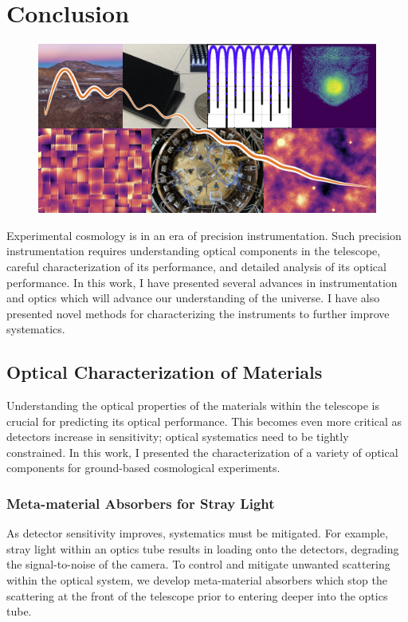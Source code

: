 \chapter{Conclusion}
\label{ch:conclusion}
\begin{figure}[H]
    \centering
    \includegraphics[width = \textwidth]{Figures/conclusion.png}
    \label{fig:finalfigure}
\end{figure}
Experimental cosmology is in an era of precision instrumentation.  Such precision instrumentation requires understanding optical components in the telescope, careful characterization of its performance, and detailed analysis of its optical performance.  In this work, I have presented several advances in instrumentation and optics which will advance our understanding of the universe.  I have also presented novel methods for characterizing the instruments to further improve systematics. 

\section{Optical Characterization of Materials}
Understanding the optical properties of the materials within the telescope is crucial for predicting its optical performance.  This becomes even more critical as detectors increase in sensitivity; optical systematics need to be tightly constrained.
In this work, I presented the characterization of a variety of optical components for ground-based cosmological experiments.  

\subsection{Meta-material Absorbers for Stray Light}
As detector sensitivity improves, systematics must be mitigated. For example, stray light within an optics tube results in loading onto the detectors, degrading the signal-to-noise of the camera.  To control and mitigate unwanted scattering within the optical system, we develop meta-material absorbers which stop the scattering at the front of the telescope prior to entering deeper into the optics tube.  
 
